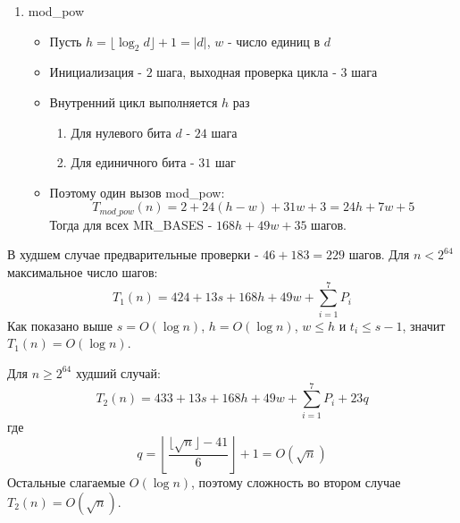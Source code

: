 \documentclass[12pt]{article}
\begin{document}
\begin{enumerate}
\begin{itemize}
        \item Переход к следующему MR\_BASES - $4$ шага, значит
        $28$ шагов для всех MR\_BASES. Финальная проверка цикла
        и сохранение результата - $5$ шагов

        \item Таким образом, для выполнения всех семи 
        MR\_BASES без учёта mod\_pow:
        \[
            T_{MR\setminus mod\_pow}
            =14+13s+105+\sum_{i=1}^{7}P_i+28+5
            =152+13s+\sum_{i=1}^{7}P_i
        \]
    \end{itemize}

    \item mod\_pow
    \begin{itemize}
        \item Пусть $h=\lfloor\log_2 d\rfloor+1=|d|$, $w$ - число единиц в $d$
        \item Инициализация - $2$ шага, выходная проверка цикла - $3$ шага
        \item Внутренний цикл выполняется $h$ раз
        \begin{enumerate}
            \item Для нулевого бита $d$ - $24$ шага
            \item Для единичного бита - $31$ шаг
        \end{enumerate}
        \item Поэтому один вызов mod\_pow:
        \[
            T_{mod\_pow}(n)
            =2+24(h-w)+31w+3
            =24h+7w+5
        \]
        Тогда для всех MR\_BASES - $168h+49w+35$ шагов.
    \end{itemize}
\end{enumerate}

В худшем случае предварительные проверки - $46+183=229$
шагов. Для $n<2^{64}$ максимальное число шагов:
\[
T_1(n)=424+13s+168h+49w+\sum_{i=1}^{7}P_i
\]
Как показано выше $s=O(\log n)$, $h=O(\log n)$, $w\leq h$ и
$t_i\leq s-1$, значит $T_1(n)=O(\log n)$.

Для $n\geq2^{64}$ худший случай:
\[
T_2(n)=433+13s+168h+49w+\sum_{i=1}^{7}P_i+23q
\]
где
\[
q=\left\lfloor
\frac{\lfloor\sqrt n\rfloor-41}{6}
\right\rfloor+1=O(\sqrt n)
\]
Остальные слагаемые $O(\log n)$, поэтому
сложность во втором случае $T_2(n)=O(\sqrt n)$.
\end{document}
